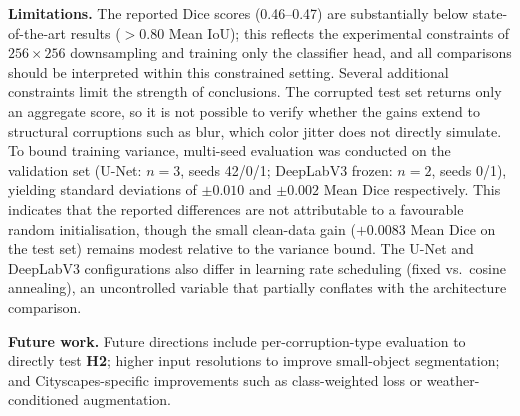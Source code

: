 \documentclass[conference]{IEEEtran}
\begin{document}
\textbf{Limitations.}
The reported Dice scores (0.46--0.47) are substantially below state-of-the-art results ($>$0.80 Mean IoU); this reflects the experimental constraints of $256\times256$ downsampling and training only the classifier head, and all comparisons should be interpreted within this constrained setting. Several additional constraints limit the strength of conclusions. The corrupted test set returns only an aggregate score, so it is not possible to verify whether the gains extend to structural corruptions such as blur, which color jitter does not directly simulate. To bound training variance, multi-seed evaluation was conducted on the validation set (U-Net: $n{=}3$, seeds 42/0/1; DeepLabV3 frozen: $n{=}2$, seeds 0/1), yielding standard deviations of $\pm0.010$ and $\pm0.002$ Mean Dice respectively. This indicates that the reported differences are not attributable to a favourable random initialisation, though the small clean-data gain ($+0.0083$ Mean Dice on the test set) remains modest relative to the variance bound. The U-Net and DeepLabV3 configurations also differ in learning rate scheduling (fixed vs.\ cosine annealing), an uncontrolled variable that partially conflates with the architecture comparison.

\textbf{Future work.}
Future directions include per-corruption-type evaluation to directly test \textbf{H2}; higher input resolutions to improve small-object segmentation; and Cityscapes-specific improvements such as class-weighted loss or weather-conditioned augmentation.



\end{document}
